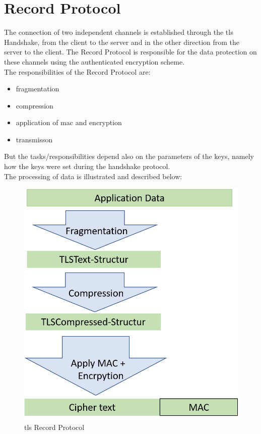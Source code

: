 \section{Record Protocol}
\label{sec:record_protocol}

The connection of two independent channels is established through the \gls{tls} Handshake, from the client to the server and in the other direction from the server to the client. The Record Protocol is responsible for the data protection on these channels using the authenticated encryption scheme.\\
The responsibilities of the Record Protocol are:
\begin{itemize}
	\item fragmentation
	\item compression
	\item application of \gls{mac} and encryption
	\item transmisson 
\end{itemize}
But the tasks/responsibilities depend also on the parameters of the keys, namely how the keys were set during the handshake protocol. \\
The processing of data is illustrated and described below:      

\begin{figure}[H]
	\centering
		\includegraphics[scale=0.5]{images/tls_recordprotocol.png}
	\caption{\gls{tls} Record Protocol}
	\label{fig:tls_recordprotocol}
\end{figure}

